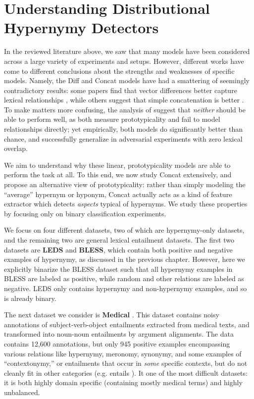 \section{Understanding Distributional Hypernymy Detectors}

In the reviewed literature above, we saw that many models have been considered
across a large variety of experiments and setups. However, different works have
come to different conclusions about the strengths and weaknesses of specific
models. Namely, the Diff and Concat models have had a smattering of seemingly
contradictory results: some papers find that vector differences better capture
lexical relationships \cite{fu:2014:acl,roller:2014:coling,vylomova:2016:acl},
while others suggest that simple concatenation is better
\cite{baroni:2012:eacl,weeds:2014:coling,shwartz:2016:acl}. To make matters
more confusing, the analysis of  suggest that
{\em neither} should be able to perform well, as both measure prototypicality
and fail to model relationships directly; yet empirically, both models do
significantly better than chance, and successfully generalize in adversarial
experiments with zero lexical overlap.

We aim to understand why these linear, prototypicality models are able to
perform the task at all. To this end, we now study Concat extensively, and
propose an alternative view of prototypicality: rather than simply modeling the
``average'' hypernym or hyponym, Concat actually acts as a kind of feature
extractor which detects {\em aspects} typical of hypernyms.  We study these
properties by focusing only on binary classification experiments.

We focus on four different datasets, two of which are hypernymy-only datasets, and the remaining two are general lexical entailment datasets. The first
two datasets are {\bf LEDS} and {\bf BLESS}, which contain both positive and
negative examples of hypernymy, as discussed in the previous chapter. However,
here we explicitly binarize the BLESS dataset such that all hypernymy examples
in BLESS are labeled as positive, while random and other relations are labeled
as negative. LEDS only contains hypernymy and non-hypernymy examples, and so is
already binary.

The next dataset we consider is {\bf Medical} \cite{levy:2014:conll}. This
dataset contains noisy annotations of subject-verb-object entailments
extracted from medical texts, and transformed into noun-noun entailments by
argument alignments. The data contains 12,600 annotations, but only 945
positive examples encompassing various relations like hypernymy, meronomy,
synonymy, and some examples of ``contextonymy,'' or entailments that occur in
{\em some} specific contexts, but do not cleanly fit in other categories (e.g.
 entails ). It one of the most difficult datasets:
it is both highly domain specific (containing mostly medical terms) and highly
unbalanced.

